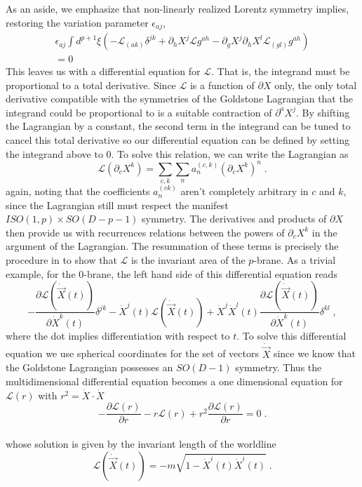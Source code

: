 \documentclass[%
 reprint,
 amsmath,amssymb,
 aps,
]{revtex4-1}
\begin{document}
As an aside, we emphasize that non-linearly realized Lorentz symmetry implies, restoring the variation parameter $\epsilon_{a j}$,
\begin{eqnarray}
    \epsilon_{a j} \int d^{p+1} \xi \left(
    -\mathcal{L}_{(a k)} \delta^{j k}
    + \partial_h X^j \mathcal{L} g^{a h}
    - \partial_g X^j \partial_h X^l \mathcal{L}_{(g l)} g^{a h} \right) \nonumber \\
    = 0 \nonumber
\end{eqnarray}
This leaves us with a differential equation for $\mathcal{L}$. That is, the integrand must be
proportional to a total derivative. Since $\mathcal{L}$ is a function of
$\partial X$ only, the only total derivative compatible with the symmetries of the Goldstone Lagrangian
that the integrand could be proportional to is a suitable contraction of $\partial^a X^j$. By shifting the
Lagrangian by a constant, the second term in the integrand can be tuned to cancel this total derivative so
our differential equation can be defined by setting the integrand above to 0.
To solve this relation, we can write the Lagrangian as
\begin{equation}
    \mathcal{L}(\partial_c X^k) = \sum_{c, k} \sum_n a^{(c, k)}_n (\partial_c X^k)^n \; . \nonumber
\end{equation}
again, noting that the coefficients $a_n^{(c k)}$ aren't completely arbitrary in $c$ and $k$, since the Lagrangian still must
respect the manifest $ISO(1,p) \times SO(D-p-1)$ symmetry. The derivatives and products of $\partial X$ then provide us with
recurrences relations between the powers of $\partial_c X^k$ in the argument of the Lagrangian. The resummation of these terms
is precisely the procedure in \cite{Gliozzi:2012cx} to show that $\mathcal{L}$ is the invariant area of the $p$-brane.
As a trivial example, for the $0$-brane, the left hand side of this differential equation reads
\begin{equation}
    -\frac{\partial \mathcal{L}(\dot{\vec{X}}(t) )}{\partial \dot{X}^k(t) } \delta^{jk} - \dot{X}^j(t) \mathcal{L}(\dot{\vec{X}}(t))
    + \dot{X}^j \dot{X}^l(t) \frac{\partial \mathcal{L}(\dot{\vec{X}}(t) )}{\partial \dot{X}^k(t)} \delta^{kl} \; , \nonumber
\end{equation}
where the dot implies differentiation with respect to $t$.  To solve this differential equation we use spherical coordinates for the
set of vectors $\dot{\vec{X}}$ since we know that the Goldstone Lagrangian possesses an $SO(D-1)$ symmetry.
Thus the multidimensional differential equation becomes a one dimensional equation for $\mathcal{L}(r)$ with $r^2 = \dot{X} \cdot \dot{X}$
\begin{equation}
    -\frac{\partial \mathcal{L}(r)}{\partial r} - r \mathcal{L}(r) + r^2 \frac{\partial \mathcal{L}(r)}{\partial r} = 0 \; . \nonumber
\end{equation}
\\
whose solution is given by the invariant length of the worldline
\begin{equation}
    \mathcal{L}(\dot{\vec{X}}(t)) = -m \sqrt{1 - \dot{X}^i(t) \dot{X}^i(t)} \; . \nonumber
\end{equation}
\end{document}
